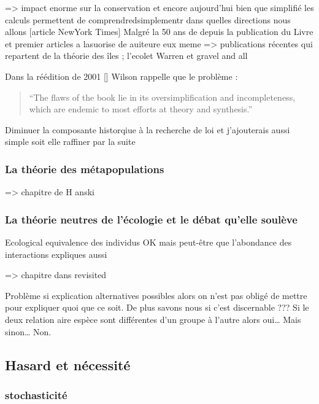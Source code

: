 =\textgreater{} impact enorme sur la conservation et encore aujourd'hui
bien que simplifié les calculs permettent de comprendredsimplementr dans
quelles directions nous allons {[}article NewYork Times{]} Malgré la 50
ans de depuis la publication du Livre et premier articles a lasuorise de
auiteure eux meme =\textgreater{} publications récentes qui repartent de
la théorie des îles ; l'ecolet Warren et gravel and all

Dans la réédition de 2001 {[}{]} Wilson rappelle que le problème :

\begin{quote}
``The flaws of the book lie in its oversimplification and
incompleteness, which are endemic to most efforts at theory and
synthesis.''
\end{quote}

Diminuer la composante historqiue à la recherche de loi et j'ajouterais
aussi simple soit elle raffiner par la suite

\subsubsection{La théorie des
métapopulations}\label{la-thuxe9orie-des-muxe9tapopulations}

=\textgreater{} chapitre de H anski

\subsubsection{La théorie neutres de l'écologie et le débat qu'elle
soulève}\label{la-thuxe9orie-neutres-de-luxe9cologie-et-le-duxe9bat-quelle-souluxe8ve}

Ecological equivalence des individus OK mais peut-être que l'abondance
des interactions expliques aussi

=\textgreater{} chapitre dans revisited

Problème si explication alternatives possibles alors on n'est pas obligé
de mettre pour expliquer quoi que ce soit. De plus savons nous si c'est
discernable ??? Si le deux relation aire espèce sont différentes d'un
groupe à l'autre alors oui\ldots{} Mais sinon\ldots{} Non.

\subsection*{Hasard et nécessité}\label{hasard-et-nuxe9cessituxe9}

\subsubsection*{stochasticité}\label{stochasticituxe9}

